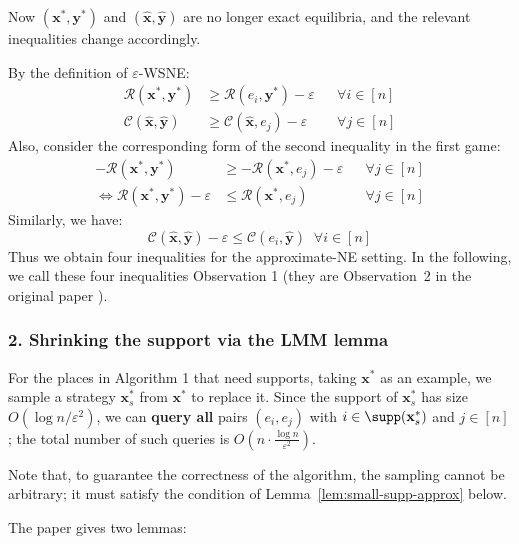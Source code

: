 Now \((\mathbf{x}^*, \mathbf{y}^*)\) and \((\hat{\mathbf{x}}, \hat{\mathbf{y}})\) are no longer exact equilibria, and the relevant inequalities change accordingly.

By the definition of \(\varepsilon\)-WSNE:
\begin{align*}
  \mathcal{R}(\mathbf{x}^*, \mathbf{y}^*)         & \ge \mathcal{R}(e_i, \mathbf{y}^*) - \varepsilon     &  & \forall i \in [n] \\
  \mathcal{C}(\hat{\mathbf{x}}, \hat{\mathbf{y}}) & \ge \mathcal{C}(\hat{\mathbf{x}}, e_j) - \varepsilon &  & \forall j \in [n]
\end{align*}
Also, consider the corresponding form of the second inequality in the first game:
\begin{align*}
  -\mathcal{R}(\mathbf{x}^*, \mathbf{y}^*)                   & \ge -\mathcal{R}(\mathbf{x}^*, e_j) - \varepsilon &  & \forall j \in [n] \\
  \iff \mathcal{R}(\mathbf{x}^*, \mathbf{y}^*) - \varepsilon & \le \mathcal{R}(\mathbf{x}^*, e_j)                &  & \forall j \in [n]
\end{align*}
Similarly, we have:
\[
  \mathcal{C}(\hat{\mathbf{x}}, \hat{\mathbf{y}}) - \varepsilon \le \mathcal{C}(e_i, \hat{\mathbf{y}}) \;\; \forall i \in [n]
\]
Thus we obtain four inequalities for the approximate-NE setting. In the following, we call these four inequalities Observation 1 (they are Observation~2 in the original paper \cite[Observation~2]{12WSNE}).

\subsubsection*{2. Shrinking the support via the LMM lemma}

For the places in Algorithm 1 that need supports, taking \(\mathbf{x}^*\) as an example, we sample a strategy \(\mathbf{x}_s^*\) from \(\mathbf{x}^*\) to replace it. Since the support of \(\mathbf{x}_s^*\) has size \(O(\log n / \varepsilon^2)\), we can \textbf{query all} pairs \((e_i, e_j)\) with \(i \in \supp(\mathbf{x}_s^*)\) and \(j \in [n]\); the total number of such queries is \(O(n \cdot \frac{\log n}{\varepsilon^2})\).

Note that, to guarantee the correctness of the algorithm, the sampling cannot be arbitrary; it must satisfy the condition of Lemma~\ref{lem:small-supp-approx} below.

The paper gives two lemmas:

